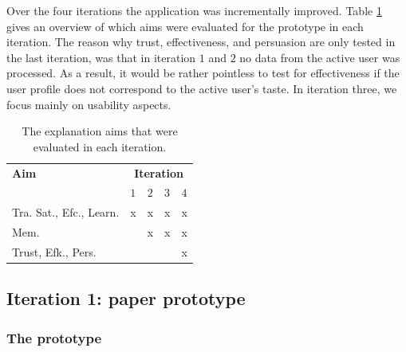 Over the four iterations the application was incrementally improved. Table \ref{table:iteration:aims} gives an overview of which aims were evaluated for the prototype in each iteration. The reason why trust, effectiveness, and persuasion are only tested in the last iteration, was that in iteration $1$ and $2$ no data from the active user was processed. As a result, it would be rather pointless to test for effectiveness if the user profile does not correspond to the active user's taste. In iteration three, we focus mainly on usability aspects.

\begin{table}
	\caption{The explanation aims that were evaluated in each iteration.}
	\begin{center}
		\begin{tabular}{l | l l l l }
			\hline
			\textbf{Aim} 							& \multicolumn{4}{c}{\textbf{Iteration}} \\
																\cline{2-5}
																& $1$ & $2$ & $3$ & $4$ \\
			\hline
			Tra. Sat., Efc., Learn.		&	x 	&	x		&	x		&	x	\\
			Mem.											&	  	&	x		&	x		&	x	\\
			Trust, Efk., Pers.				&	  	&	 		&	 		&	x	\\
			\hline
		\end{tabular}
	\end{center}
	\label{table:iteration:aims}
\end{table}



\subsection{Iteration 1: paper prototype}\label{chapter:prototype:section:paper}


\subsubsection{The prototype}\label{chapter:prototype:section:paper:prototype}

